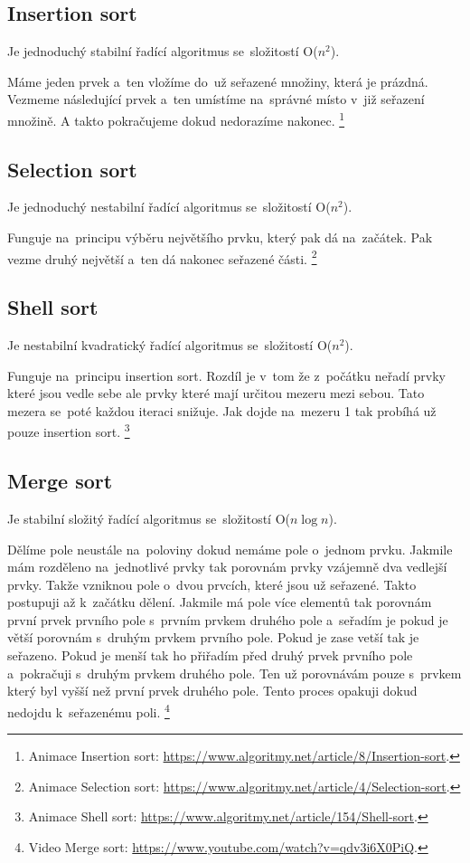\subsection{Insertion sort}

Je jednoduchý stabilní řadící algoritmus se~složitostí O($n^2$).

Máme jeden prvek a~ten vložíme do~už seřazené množiny, která je prázdná. Vezmeme následující prvek a~ten umístíme na~správné místo v~již seřazení množině. A takto pokračujeme dokud nedorazíme nakonec.%
\footnote{Animace Insertion sort: \url{https://www.algoritmy.net/article/8/Insertion-sort}.}

\subsection{Selection sort}

Je jednoduchý nestabilní řadící algoritmus se~složitostí O($n^2$).

Funguje na~principu výběru největšího prvku, který pak dá na~začátek. Pak vezme druhý největší a~ten dá nakonec seřazené části.%
\footnote{Animace Selection sort: \url{https://www.algoritmy.net/article/4/Selection-sort}.}

\subsection{Shell sort}

Je nestabilní kvadratický řadící algoritmus se~složitostí O($n^2$).

Funguje na~principu insertion sort. Rozdíl je v~tom že z~počátku neřadí prvky které jsou vedle sebe ale prvky které mají určitou mezeru mezi sebou. Tato mezera se~poté každou iteraci snižuje. Jak dojde na~mezeru 1 tak probíhá už pouze insertion sort.%
\footnote{Animace Shell sort: \url{https://www.algoritmy.net/article/154/Shell-sort}.}

\subsection{Merge sort}

Je stabilní složitý řadící algoritmus se~složitostí O($n\log{n}$).

Dělíme pole neustále na~poloviny dokud nemáme pole o~jednom prvku. Jakmile mám rozděleno na~jednotlivé prvky tak porovnám prvky vzájemně dva vedlejší prvky. Takže vzniknou pole o~dvou prvcích, které jsou už seřazené. Takto postupuji až k~začátku dělení. Jakmile má pole více elementů tak porovnám první prvek prvního pole s~prvním prvkem druhého pole a~seřadím je pokud je větší porovnám s~druhým prvkem prvního pole. Pokud je zase vetší tak je seřazeno. Pokud je menší tak ho přiřadím před druhý prvek prvního pole a~pokračuji s~druhým prvkem druhého pole. Ten už porovnávám pouze s~prvkem který byl vyšší než první prvek druhého pole. Tento proces opakuji dokud nedojdu k~seřazenému poli.%
\footnote{Video Merge sort: \url{https://www.youtube.com/watch?v=qdv3i6X0PiQ}.}

